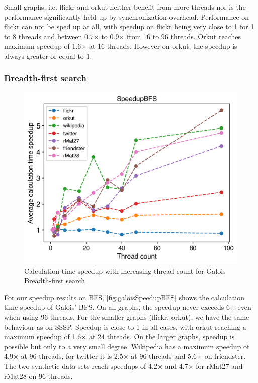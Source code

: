 Small graphs, i.e. flickr and orkut neither benefit from more threads nor is the performance significantly held up by synchronization overhead.
Performance on flickr can not be sped up at all, with speedup on flickr being very close to 1 for 1 to 8 threads and between 0.7$\times$ to 0.9$\times$ from 16 to 96 threads.
Orkut reaches maximum speedup of 1.6$\times$ at 16 threads. However on orkut, the speedup is always greater or equal to 1.


\subsubsection{Breadth-first search}
\begin{figure}
	\includegraphics[width=\linewidth]{../../plots/singleNodeBFSGaloisThreads.png}
	\caption{Calculation time speedup with increasing thread count for Galois Breadth-first search}
	\label{fig:galoisSpeedupBFS}
\end{figure}

For our speedup results on BFS, \autoref{fig:galoisSpeedupBFS} shows the calculation time speedup of Galois' BFS.
On all graphs, the speedup never exceeds 6$\times$ even when using 96 threads.
For the smaller graphs (flickr, orkut), we have the same behaviour as on SSSP. Speedup is close to 1 in all cases, with orkut reaching a maximum speedup of 1.6$\times$ at 24 threads.
On the larger graphs, speedup is possible but only to a very small degree.
Wikipedia has a maximum speedup of 4.9$\times$ at 96 threads, for twitter it is 2.5$\times$ at 96 threads and 5.6$\times$ on friendster. The two synthetic data sets reach speedups of 4.2$\times$ and 4.7$\times$ for rMat27 and rMat28 on 96 threads.



